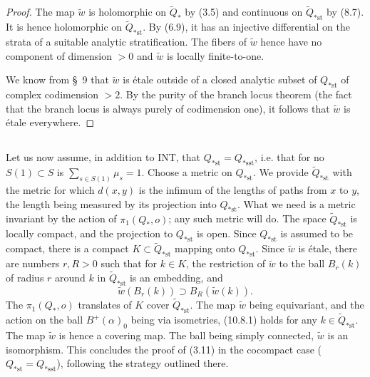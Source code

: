 \documentclass[12pt,a4paper]{article}
\theoremstyle{plain}
\theoremstyle{definition}
\theoremstyle{remark}
\begin{document}
\begin{proof}
The map $\widetilde{w}$ is holomorphic on $\widetilde{Q}_*$ by (3.5) and continuous on $\widetilde{Q}_{*\text{st}}$ by (8.7). It is hence holomorphic on $\widetilde{Q}_{*\text{st}}$. By (6.9), it has an injective differential on the strata of a suitable analytic stratification. The fibers of $\widetilde{w}$ hence have no component of dimension $> 0$ and $\widetilde{w}$ is locally finite-to-one.

We know from \S\ 9 that $\widetilde{w}$ is \'etale outside of a closed analytic subset of $Q_{*\text{st}}$ of complex codimension $> 2$. By the purity of the branch locus theorem (the fact that the branch locus is always purely of codimension one), it follows that $\widetilde{w}$ is \'etale everywhere.
\end{proof}

\subsection{}
\label{10.8}

Let us now assume, in addition to INT, that $Q_{*\text{st}} = Q_{*\text{sst}}$, i.e. that for no $S(1) \subset S$ is $\sum_{s \in S(1)} \mu_s = 1$. Choose a metric on $Q_{*\text{st}}$. We provide $\widetilde{Q}_{*\text{st}}$ with the metric for which $d(x, y)$ is the infimum of the lengths of paths from $x$ to $y$, the length being measured by its projection into $Q_{*\text{st}}$. What we need is a metric invariant by the action of $\pi_1(Q_*, o)$; any such metric will do. The space $\widetilde{Q}_{*\text{st}}$ is locally compact, and the projection to $Q_{*\text{st}}$ is open. Since $Q_{*\text{st}}$ is assumed to be compact, there is a compact $K \subset \widetilde{Q}_{*\text{st}}$ mapping onto $Q_{*\text{st}}$. Since $\widetilde{w}$ is \'etale, there are numbers $r, R > 0$ such that for $k \in K$, the restriction of $\widetilde{w}$ to the ball $B_r(k)$ of radius $r$ around $k$ in $\widetilde{Q}_{*\text{st}}$ is an embedding, and
\begin{equation}
\label{10.8.1}
\widetilde{w}(B_r(k)) \supset B_R(\widetilde{w}(k)).
\end{equation}
The $\pi_1(Q_*, o)$ translates of $K$ cover $\widetilde{Q}_{*\text{st}}$. The map $\widetilde{w}$ being equivariant, and the action on the ball $B^+(\alpha)_0$ being via isometries, (10.8.1) holds for any $k \in \widetilde{Q}_{*\text{st}}$. The map $\widetilde{w}$ is hence a covering map. The ball being simply connected, $\widetilde{w}$ is an isomorphism. This concludes the proof of (3.11) in the cocompact case ($Q_{*\text{st}} = Q_{*\text{sst}}$), following the strategy outlined there.
\end{document}
